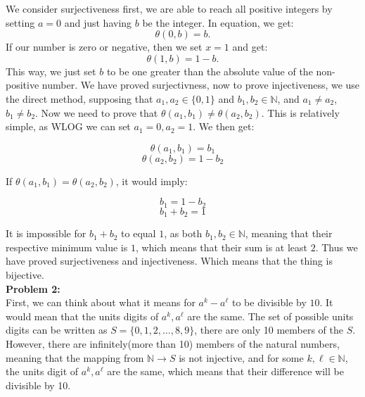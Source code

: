 \documentclass[12pt]{article}
\begin{document}
\noindent
We consider surjectiveness first, we are able to reach all positive integers by setting
$a = 0$ and just having $b$ be the integer. In equation, we get: 
\[
\theta(0, b) = b  
.\] 
If our number is zero or negative, then we set $x = 1$ and get:
\[
\theta(1, b) = 1-b
.\] 
This way, we just set $b$ to be one greater than the absolute value of the non-positive number. 
We have proved surjectivness, now to prove injectiveness, we use the direct method, supposing that
$a_1,a_2 \in \{0, 1\}$ and  $b_1,b_2 \in \mathbb{N}$, and $a_1\neq a_2$, $b_1 \neq b_2$. Now we need to prove
that $\theta(a_1,b_1) \neq \theta(a_2,b_2)$. This is relatively simple, as WLOG we can set $a_1 = 0, a_2 = 1$.
We then get:
\begin{center}
	$$\theta(a_1,b_1) = b_1$$
	$$\theta(a_2,b_2) = 1 - b_2$$
\end{center} 
If $\theta(a_1,b_1) = \theta(a_2,b_2)$, it would imply:
\begin{center}
	$$b_1=1-b_2$$
	$$b_1+b_2=1$$
\end{center}
It is impossible for $b_1 + b_2$ to equal $1$, as both $b_1, b_2 \in \mathbb{N}$, meaning that their 
respective minimum value is $1$, which means that their sum is at least $2$. Thus we have proved surjectiveness
and injectiveness. Which means that the thing is bijective. \\

\noindent
\textbf{Problem 2: } \\

\noindent
First, we can think about what it means for $a^{k}-a^{\ell}$ to be divisible by $10$. It would mean that the 
units digits of $a^{k}, a^{\ell}$ are the same. The set of possible units digits can be written as 
$S = \{0, 1, 2, \ldots, 8, 9\}$, there are only 10 members of the $S$. However, there are infinitely(more than 10)
members of the natural numbers, meaning that the mapping from $\mathbb{N} \to S$ is not injective,
and for some $k, \ell \in \mathbb{N}$, the units digit of $a^{k}, a^{\ell}$ are the same,
which means that their difference will be divisible by 10.
\end{document}
